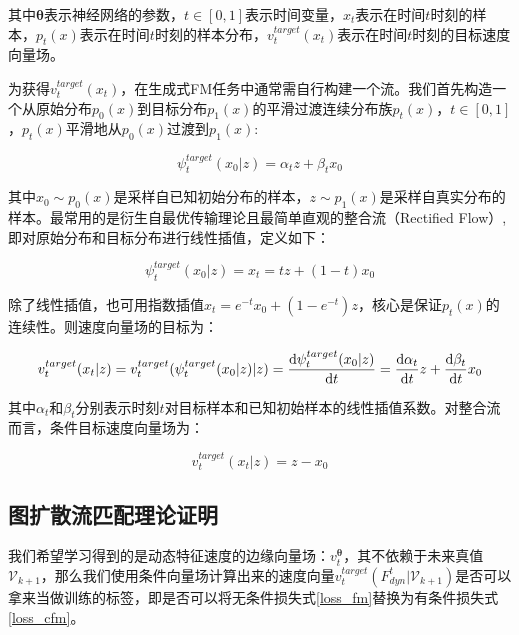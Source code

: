       其中$\bm{\theta}$表示神经网络的参数，$t \in [0,1]$表示时间变量，$x_t$表示在时间$t$时刻的样本，$p_t(x)$表示在时间$t$时刻的样本分布，$v_t^{target}(x_t)$表示在时间$t$时刻的目标速度向量场。
      
      为获得$v_t^{target}(x_t)$，在生成式FM任务中通常需自行构建一个流。我们首先构造一个从原始分布$p_0(x)$到目标分布$p_1(x)$的平滑过渡连续分布族$p_t(x)$，$t\in [0,1]$，$p_t(x)$平滑地从$p_0(x)$过渡到$p_1(x)$:

      \begin{equation}\psi_t^{target}(x_0|z)=\alpha_t z+ \beta_t x_0 
      \end{equation}

      其中$x_0 \sim p_0(x)$是采样自已知初始分布的样本，$z \sim p_1(x)$是采样自真实分布的样本。最常用的是衍生自最优传输理论且最简单直观的整合流（Rectified Flow）,即对原始分布和目标分布进行线性插值，定义如下：

      \begin{equation} \psi_t^{target}(x_0|z) = x_t = t z + (1-t)x_0 
      \end{equation}

      除了线性插值，也可用指数插值$x_t = e^{-t}x_0 + (1-e^{-t})z$，核心是保证$p_t(x)$的连续性。则速度向量场的目标为：

      \begin{equation} v_t^{target}(x_t|z) = v_t^{target}(\psi_t^{target}(x_0|z)|z) \\
      = \frac{\mathrm{d}\psi_t^{target}(x_0|z)}{\mathrm{d}t} = \frac{\mathrm{d}\alpha_t}{\mathrm{d}t} z + \frac{\mathrm{d}\beta_t}{\mathrm{d}t} x_0
      \end{equation}

      其中$\alpha_t$和$\beta_t$分别表示时刻$t$对目标样本和已知初始样本的线性插值系数。对整合流而言，条件目标速度向量场为：

      \begin{equation} v_t^{target}(x_t|z) = z - x_0 \end{equation}

  \subsection{图扩散流匹配理论证明}
  \label{sub:graphflow_proof}
    我们希望学习得到的是动态特征速度的边缘向量场：$v_t^\bm{\theta}$，其不依赖于未来真值$\mathcal{V}_{k+1}$，那么我们使用条件向量场计算出来的速度向量$v_t^{target}(F_{dyn}^{t}|\mathcal{V}_{k+1})$是否可以拿来当做训练的标签，即是否可以将无条件损失式\eqref{loss_fm}替换为有条件损失式\eqref{loss_cfm}。

